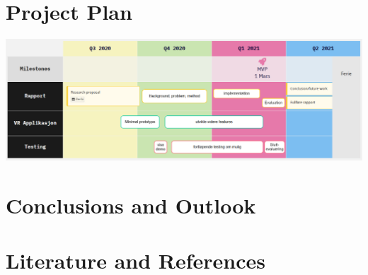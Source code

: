 \documentclass[11pt]{scrartcl}
\begin{document}
\section{Project Plan}

\includegraphics[width=\textwidth]{timeline.png}


\section{Conclusions and Outlook}

\section{Literature and References}


\printbibliography
\end{document}
